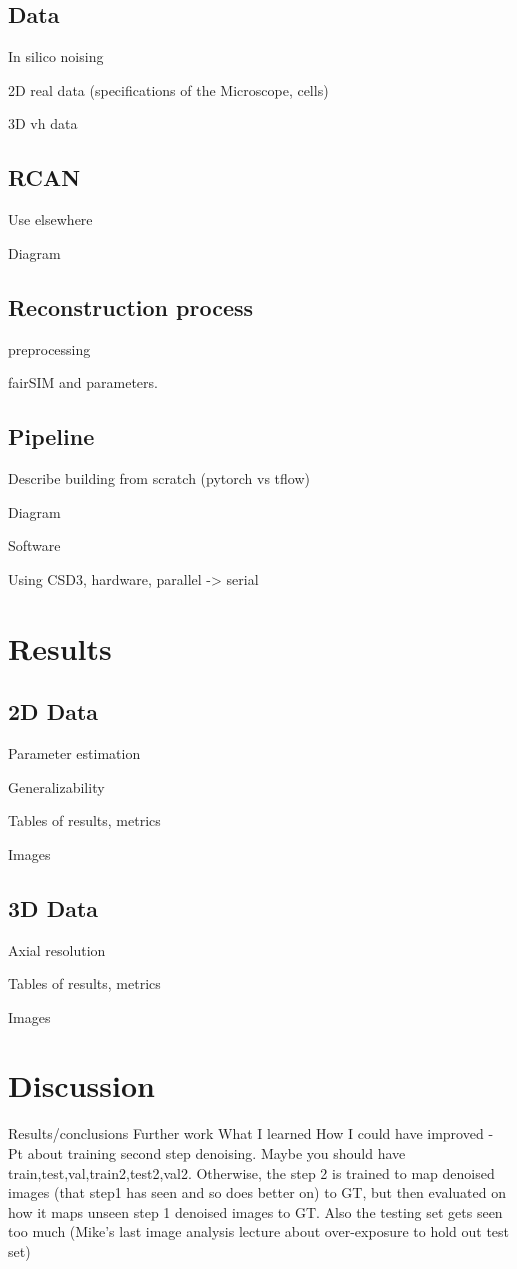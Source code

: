 \documentclass[12pt]{article}
\begin{document}
\subsection{Data}
In silico noising

2D real data (specifications of the Microscope, cells)

3D vh data

\subsection{RCAN}
Use elsewhere

Diagram

\subsection{Reconstruction process}
preprocessing

fairSIM and parameters.

\subsection{Pipeline}
Describe building from scratch (pytorch vs tflow)

Diagram

Software

Using CSD3, hardware, parallel -> serial

\section{Results}

\subsection{2D Data}

Parameter estimation

Generalizability

Tables of results, metrics

Images

\subsection{3D Data}

Axial resolution

Tables of results, metrics

Images

\section{Discussion}
Results/conclusions
Further work
What I learned
How I could have improved
- Pt about training second step denoising. Maybe you should have train,test,val,train2,test2,val2.
Otherwise, the step 2 is trained to map denoised images (that step1 has seen and so does better on) to GT,
but then evaluated on how it maps unseen step 1 denoised images to GT. Also the testing set gets seen too much (Mike's
last image analysis lecture about over-exposure to hold out test set)
\end{document}
